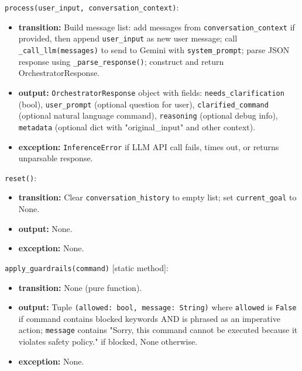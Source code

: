 \documentclass[12pt, titlepage]{article}
\begin{document}
\noindent\texttt{process(user\_input, conversation\_context)}:
\begin{itemize}
\item \textbf{transition:} Build message list: add messages from \texttt{conversation\_context} if provided, then append \texttt{user\_input} as new user message; call \texttt{\_call\_llm(messages)} to send to Gemini with \texttt{system\_prompt}; parse JSON response using \texttt{\_parse\_response()}; construct and return OrchestratorResponse.
\item \textbf{output:} \texttt{OrchestratorResponse} object with fields: \texttt{needs\_clarification} (bool), \texttt{user\_prompt} (optional question for user), \texttt{clarified\_command} (optional natural language command), \texttt{reasoning} (optional debug info), \texttt{metadata} (optional dict with "original\_input" and other context).
\item \textbf{exception:} \texttt{InferenceError} if LLM API call fails, times out, or returns unparsable response.
\end{itemize}

\noindent\texttt{reset()}:
\begin{itemize}
\item \textbf{transition:} Clear \texttt{conversation\_history} to empty list; set \texttt{current\_goal} to None.
\item \textbf{output:} None.
\item \textbf{exception:} None.
\end{itemize}

\noindent\texttt{apply\_guardrails(command)} [static method]:
\begin{itemize}
\item \textbf{transition:} None (pure function).
\item \textbf{output:} Tuple \texttt{(allowed: bool, message: String)} where \texttt{allowed} is \texttt{False} if command contains blocked keywords AND is phrased as an imperative action; \texttt{message} contains "Sorry, this command cannot be executed because it violates safety policy." if blocked, None otherwise.
\item \textbf{exception:} None.
\end{itemize}
\end{document}
